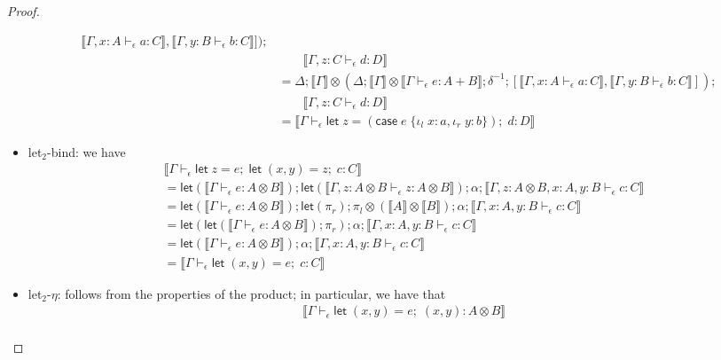 \documentclass[acmsmall,screen,review]{acmart}
\newcommand{\ms}[1]{\ensuremath{\mathsf{#1}}}
\newcommand{\lto}{:}
\newcommand{\linl}[1]{\iota_l\;{#1}}
\newcommand{\linr}[1]{\iota_r\;{#1}}
\newcommand{\letexpr}[3]{\ensuremath{\ms{let}\;#1 = #2;\;#3}}
\newcommand{\caseexpr}[5]{\ms{case}\;#1\;\{\linl{#2} \lto #3, \linr{#4} \lto #5\}}
\newcommand{\bhyp}[2]{#1 : #2}
\newcommand{\hasty}[4]{#1 \vdash_{#2} #3: {#4}}
\newcommand{\brle}[1]{{\textsf{#1}}}
\newcommand{\dnt}[1]{\llbracket{#1}\rrbracket}
\newcommand{\lmor}[1]{\ms{let}(#1)}
\begin{document}
\begin{proof}
\begin{itemize}[leftmargin=*]
\begin{align*}
                        \dnt{\hasty{\Gamma, \bhyp{x}{A}}{\epsilon}{a}{C}},
                        \dnt{\hasty{\Gamma, \bhyp{y}{B}}{\epsilon}{b}{C}}
                    ]) ;
      \\ & \qquad \dnt{\hasty{\Gamma, \bhyp{z}{C}}{\epsilon}{d}{D}}
      \\ &= \Delta ; \dnt{\Gamma} \otimes (
                  \Delta ; \dnt{\Gamma} \otimes \dnt{\hasty{\Gamma}{\epsilon}{e}{A + B}} ;
                  \delta^{-1} ; [
                        \dnt{\hasty{\Gamma, \bhyp{x}{A}}{\epsilon}{a}{C}},
                        \dnt{\hasty{\Gamma, \bhyp{y}{B}}{\epsilon}{b}{C}}
                    ]) ;
      \\ & \qquad \dnt{\hasty{\Gamma, \bhyp{z}{C}}{\epsilon}{d}{D}}
      \\ &= \dnt{\hasty{\Gamma}{\epsilon}{\letexpr{z}{(\caseexpr{e}{x}{a}{y}{b})}{d}}{D}}
    \end{align*}
    \item \brle{let$_2$-bind}: we have
    \begin{align*}
      & \dnt{\hasty{\Gamma}{\epsilon}{\letexpr{z}{e}{\letexpr{(x, y)}{z}{c}}}{C}} \\
      & = \lmor{\dnt{\hasty{\Gamma}{\epsilon}{e}{A \otimes B}}}
        ; \lmor{\dnt{\hasty{\Gamma, \bhyp{z}{A \otimes B}}{\epsilon}{z}{A \otimes B}}}
        ; \alpha
        ; \dnt{\hasty{\Gamma, \bhyp{z}{A \otimes B}, \bhyp{x}{A}, \bhyp{y}{B}}{\epsilon}{c}{C}} \\
      & = \lmor{\dnt{\hasty{\Gamma}{\epsilon}{e}{A \otimes B}}}
        ; \lmor{\pi_r}
        ; \pi_l \otimes (\dnt{A} \otimes \dnt{B})
        ; \alpha
        ; \dnt{\hasty{\Gamma, \bhyp{x}{A}, \bhyp{y}{B}}{\epsilon}{c}{C}} \\
      & = \lmor{\lmor{\dnt{\hasty{\Gamma}{\epsilon}{e}{A \otimes B}}} ; \pi_r}
        ; \alpha
        ; \dnt{\hasty{\Gamma, \bhyp{x}{A}, \bhyp{y}{B}}{\epsilon}{c}{C}} \\
      & = \lmor{\dnt{\hasty{\Gamma}{\epsilon}{e}{A \otimes B}}}
        ; \alpha
        ; \dnt{\hasty{\Gamma, \bhyp{x}{A}, \bhyp{y}{B}}{\epsilon}{c}{C}} \\
      & = \dnt{\hasty{\Gamma}{\epsilon}{\letexpr{(x, y)}{e}{c}}{C}}
    \end{align*}
    \item \brle{let$_2$-$\eta$}: follows from the properties of the product; in particular,
    we have that
    \begin{align*}
      &\dnt{\hasty{\Gamma}{\epsilon}{\letexpr{(x, y)}{e}{(x, y)}}{A \otimes B}} \\

\end{align*}
\end{itemize}
\end{proof}
\end{document}
